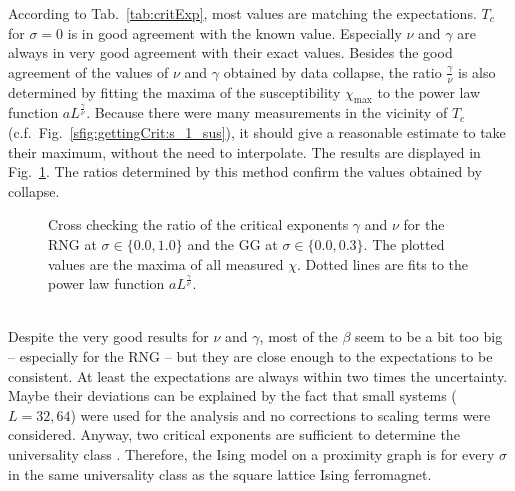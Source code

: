     According to Tab.\ \ref{tab:critExp}, most values
    are matching the expectations. \(T_c\) for \(\sigma = 0\) is in good
    agreement with the known value. Especially \(\nu\) and \(\gamma\)
    are always in very good agreement with their exact values. Besides the
    good agreement of the values of \(\nu\) and \(\gamma\) obtained by data collapse,
    the ratio \(\frac{\gamma}{\nu}\) is also determined by fitting the maxima of
    the susceptibility \(\chi_{\mathrm{max}}\) to the power law function \(aL^\frac{\gamma}{\nu}\).
    Because there were many measurements in the vicinity of \(T_c\)
    (c.f.\ Fig.\ \ref{sfig:gettingCrit:s_1_sus}), it should give a
    reasonable estimate to take their maximum, without the need to
    interpolate.
    The results are displayed in Fig.\ \ref{fig:susCrossCheck}. The ratios
    determined by this method confirm the values obtained by collapse.
    \begin{figure}[htbp]
        \centering
        \caption[Alternative Way Determining $\gamma / \nu$]
        {
            Cross checking the ratio of the critical exponents $\gamma$ and $\nu$ for
                 the RNG at $\sigma \in \{0.0, 1.0\}$ and
                 the GG at $\sigma \in \{0.0, 0.3\}$.
            The plotted values are the maxima of all measured \(\chi\).
            Dotted lines are fits to the power law function \(aL^\frac{\gamma}{\nu}\).
        }
        \label{fig:susCrossCheck}
    \end{figure}\\
    Despite the very good results for \(\nu\) and \(\gamma\), most of the
    \(\beta\) seem to be a bit too big -- especially for the RNG -- but
    they are close enough to the expectations to be consistent. At least
    the expectations are always within two times the uncertainty.
    Maybe their deviations can be explained by the fact that small
    systems (\(L=32,64\)) were used for the analysis and no corrections
    to scaling terms were considered.
    Anyway, two critical exponents are sufficient to determine the
    universality class \cite[p. 145]{Katzgraber2011}. Therefore,
    the Ising model on a proximity graph is for every \(\sigma\) in the
    same universality class as the square lattice Ising ferromagnet.

